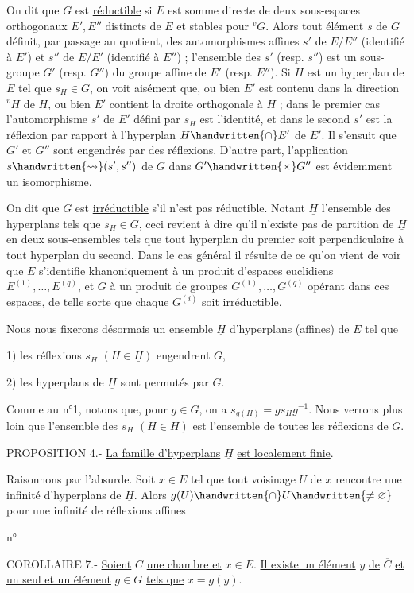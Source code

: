 On dit que $G$ est \uline{réductible} si $E$ est somme directe de deux sous-espaces orthogonaux $E',E''$ distincts de $E$ et stables pour ${}^vG$. Alors tout élément $s$ de $G$ définit, par passage au quotient, des automorphismes affines $s'$ de $E/E''$ (identifié à $E'$) et $s''$ de $E/E'$ (identifié à $E''$) ; l'ensemble des $s'$ (resp. $s''$) est un sous-groupe $G'$ (resp. $G''$) du groupe affine de $E'$ (resp. $E''$). Si $H$ est un hyperplan de $E$ tel que $s_H\in G$, on voit aisément que, ou bien $E'$ est contenu dans la direction ${}^vH$ de $H$, ou bien $E'$ contient la droite orthogonale à $H$ ; dans le premier cas l'automorphisme $s'$ de $E'$ défini par $s_H$ est l'identité, et dans le second $s'$ est la réflexion par rapport à l'hyperplan $H\handwritten{\cap}E'$ de $E'$. Il s'ensuit que $G'$ et $G''$ sont engendrés par des réflexions. D'autre part, l'application $s\handwritten{\rightsquigarrow}(s',s'')$ de $G$ dans $G'\handwritten{\times}G''$ est évidemment un isomorphisme.

On dit que $G$ est \uline{irréductible} s'il n'est pas réductible. Notant $\underline{H}$ l'ensemble des hyperplans tels que $s_H\in G$, ceci revient à dire qu'il n'existe pas de partition de $\underline{H}$ en deux sous-ensembles tels que tout hyperplan du premier soit perpendiculaire à tout hyperplan du second. Dans le cas général il résulte de ce qu'on vient de voir que $E$ s'identifie khanoniquement à un produit d'espaces euclidiens $E^{(1)},\ldots,E^{(q)}$, et $G$ à un produit de groupes $G^{(1)},\ldots,G^{(q)}$ opérant dans ces espaces, de telle sorte que chaque $G^{(i)}$ soit irréductible.

Nous nous fixerons désormais un ensemble $\underline{H}$ d'hyperplans (affines) de $E$ tel que

1) les réflexions $s_H$ $(H\in\underline{H})$ engendrent $G$,

2) les hyperplans de $\underline{H}$ sont permutés par $G$.

Comme au n°1, notons que, pour $g\in G$, on a $s_{g(H)}=gs_Hg^{-1}$. Nous verrons plus loin que l'ensemble des $s_H$ $(H\in\underline{H})$ est l'ensemble de toutes les réflexions de $G$.

PROPOSITION 4.- \uline{La famille d'hyperplans} $\underline{H}$ \uline{est localement finie}.

Raisonnons par l'absurde. Soit $x\in E$ tel que tout voisinage $U$ de $x$ rencontre une infinité d'hyperplans de $\underline{H}$. Alors $g(U)\handwritten{\cap}U\handwritten{\ne\varnothing}$ pour une infinité de réflexions affines
\begin{flushright}n°\end{flushright}
COROLLAIRE 7.- \uline{Soient} $C$ \uline{une chambre et} $x\in E$. \uline{Il existe un élément} $y$ \uline{de} $\overline{C}$ \uline{et un seul et un élément} $g\in G$ \uline{tels que} $x=g(y)$.

